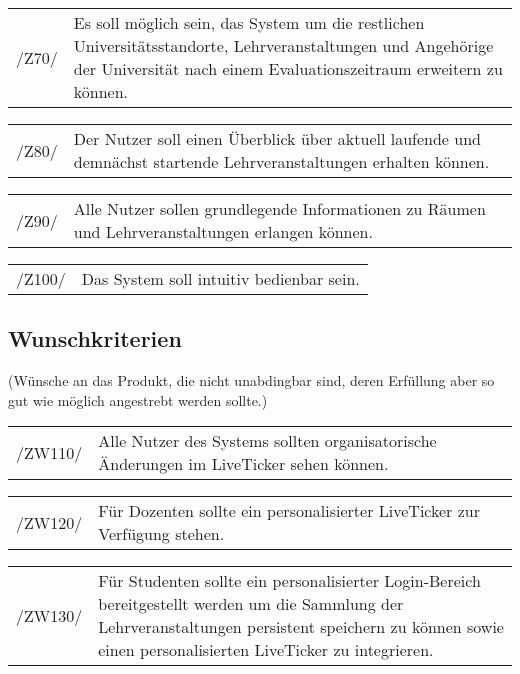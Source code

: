 \begin{tabular}{p{1.5cm}p{14.5cm}}	
	 /Z70/& Es soll möglich sein,  das System um die restlichen Universitätsstandorte, Lehrveranstaltungen und Angehörige der Universität nach einem Evaluationszeitraum erweitern zu können. \\[0.25cm]
\end{tabular}

\begin{tabular}{p{1.5cm}p{14.5cm}}	
	 /Z80/& Der Nutzer soll einen Überblick über aktuell laufende und demnächst startende Lehrveranstaltungen erhalten können. \\[0.25cm]
\end{tabular}

\begin{tabular}{p{1.5cm}p{14.5cm}}	
	 /Z90/& Alle Nutzer sollen grundlegende Informationen zu Räumen und Lehrveranstaltungen erlangen können. \\[0.25cm]
\end{tabular}

\begin{tabular}{p{1.5cm}p{14.5cm}}	
	 /Z100/& Das System soll intuitiv bedienbar sein. \\[0.25cm]
\end{tabular}

\subsection{Wunschkriterien }
(Wünsche an das Produkt, die nicht unabdingbar sind, deren Erfüllung aber so gut wie möglich angestrebt werden sollte.) \\

\begin{tabular}{p{1.5cm}p{14.5cm}}	
	 /ZW110/& Alle Nutzer des Systems sollten organisatorische Änderungen im LiveTicker sehen können. \\[0.25cm]
\end{tabular}

\begin{tabular}{p{1.5cm}p{14.5cm}}	
	 /ZW120/& Für Dozenten sollte ein personalisierter LiveTicker zur Verfügung stehen. \\[0.25cm]
\end{tabular}

\begin{tabular}{p{1.5cm}p{14.5cm}}	
	 /ZW130/& Für Studenten sollte ein personalisierter Login-Bereich bereitgestellt werden um die Sammlung der Lehrveranstaltungen persistent speichern zu können sowie einen personalisierten LiveTicker zu integrieren. \\[0.25cm]
\end{tabular}

